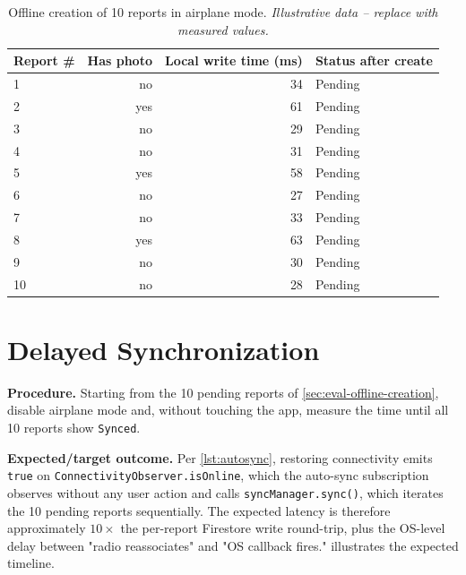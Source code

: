 \begin{table}[htbp]
\centering
\caption{Offline creation of 10 reports in airplane mode. \emph{Illustrative
data -- replace with measured values.}}
\label{tab:offline-creation-illustrative}
\begin{tabular}{@{}lrrl@{}}
\toprule
\textbf{Report \#} & \textbf{Has photo} & \textbf{Local write time (ms)} & \textbf{Status after create} \\
\midrule
1 & no  & 34 & Pending \\
2 & yes & 61 & Pending \\
3 & no  & 29 & Pending \\
4 & no  & 31 & Pending \\
5 & yes & 58 & Pending \\
6 & no  & 27 & Pending \\
7 & no  & 33 & Pending \\
8 & yes & 63 & Pending \\
9 & no  & 30 & Pending \\
10 & no & 28 & Pending \\
\bottomrule
\end{tabular}
\end{table}

\section{Delayed Synchronization}
\label{sec:eval-delayed-sync}

\textbf{Procedure.} Starting from the 10 pending reports of
\cref{sec:eval-offline-creation}, disable airplane mode and, without
touching the app, measure the time until all 10 reports show
\texttt{Synced}.

\textbf{Expected/target outcome.} Per \cref{lst:autosync}, restoring
connectivity emits \texttt{true} on \texttt{ConnectivityObserver.isOnline},
which the auto-sync subscription observes without any user action and
calls \texttt{syncManager.sync()}, which iterates the 10 pending reports
sequentially. The expected latency is therefore approximately $10 \times$
the per-report Firestore write round-trip, plus the OS-level delay between
"radio reassociates" and "OS callback fires." 
illustrates the expected timeline.

